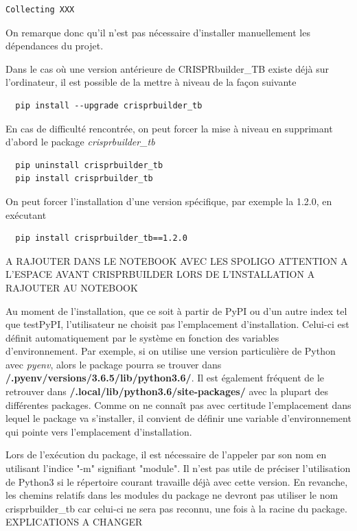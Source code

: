 \documentclass[twoside,a4paper,11pt,frenchb,openany]{report}
\begin{document}
\begin{verbatim}
Collecting XXX

\end{verbatim}

On remarque donc qu'il n'est pas nécessaire d'installer manuellement les dépendances du projet.

Dans le cas où une version antérieure de CRISPRbuilder\_TB existe déjà sur l'ordinateur, il est possible de la mettre à niveau de la façon suivante
\begin{verbatim}
  pip install --upgrade crisprbuilder_tb
\end{verbatim}

En cas de difficulté rencontrée, on peut forcer la mise à niveau en supprimant d'abord le package \textit{crisprbuilder\_tb}
\begin{verbatim}
  pip uninstall crisprbuilder_tb
  pip install crisprbuilder_tb
\end{verbatim}

On peut forcer l'installation d'une version spécifique, par exemple la 1.2.0, en exécutant
\begin{verbatim}
  pip install crisprbuilder_tb==1.2.0
\end{verbatim}





A RAJOUTER DANS LE NOTEBOOK AVEC LES SPOLIGO
ATTENTION A L'ESPACE AVANT CRISPRBUILDER LORS DE L'INSTALLATION A RAJOUTER AU NOTEBOOK

Au moment de l'installation, que ce soit à partir de PyPI ou d'un autre index tel que
testPyPI, l'utilisateur ne choisit pas l'emplacement d'installation. Celui-ci est définit automatiquement par le système en fonction des variables d'environnement. Par exemple, si on utilise une version particulière de Python avec \textit{pyenv}, alors le package pourra se trouver dans \textbf{\raisebox{-1ex}{\textasciitilde}/.pyenv/versions/3.6.5/lib/python3.6/}. Il est également fréquent de le retrouver dans \textbf{\raisebox{-1ex}{\textasciitilde}/.local/lib/python3.6/site-packages/} avec la plupart des différentes packages. Comme on ne connaît pas avec certitude l'emplacement dans lequel le package va s'installer, il convient de définir une variable d'environnement qui pointe vers l'emplacement d'installation.

Lors de l'exécution du package, il est nécessaire de l'appeler par son nom en utilisant l'indice "-m" signifiant "module". Il n'est pas utile de préciser l'utilisation de Python3 si le répertoire courant travaille déjà avec cette version. En revanche, les chemins relatifs dans les modules du package ne devront pas utiliser le nom crisprbuilder\_tb car celui-ci ne sera pas reconnu, une fois à la racine du package. EXPLICATIONS A CHANGER
\end{document}
